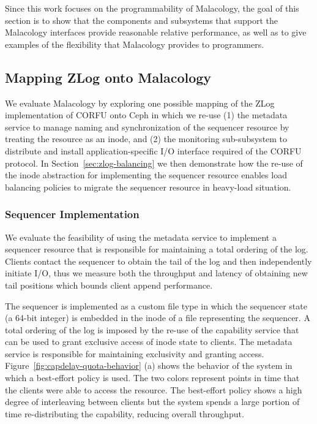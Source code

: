 \documentclass[preprint]{sigplanconf-eurosys}
\begin{document}

Since this work focuses on the programmability of Malacology, the goal of this
section is to show that the components and subsystems that support the
Malacology interfaces provide reasonable relative performance, as well as to
give examples of the flexibility that Malacology provides to programmers.


\subsection{Mapping ZLog onto Malacology}
\label{sec:mapping-zlog-onto-malacology}

We evaluate Malacology by exploring one possible mapping of the ZLog
implementation of CORFU onto Ceph in which we re-use (1) the metadata service
to manage naming and synchronization of the sequencer resource by treating the
resource as an inode, and (2) the monitoring sub-subsystem to distribute and
install application-specific I/O interface required of the CORFU protocol. In
Section~\ref{sec:zlog-balancing} we then demonstrate how the re-use of the inode
abstraction for implementing the sequencer resource enables load balancing policies
to migrate the sequencer resource in heavy-load situation.

\subsubsection{Sequencer Implementation}
\label{sec:sequencer-implementation}

We evaluate the feasibility of using the metadata service to implement a
sequencer resource that is responsible for maintaining a total ordering of
the log. Clients contact the sequencer to obtain the tail of the log and then
independently initiate I/O, thus we measure both the throughput and latency of
obtaining new tail positions which bounds client append performance.

The sequencer is implemented as a custom file type in which the sequencer
state (a 64-bit integer) is embedded in the inode of a file representing the
sequencer. A total ordering of the log is imposed by the re-use of the
capability service that can be used to grant exclusive access of inode state
to clients. The metadata service is responsible for maintaining exclusivity
and granting access. Figure~\ref{fig:capdelay-quota-behavior} (a) shows the
behavior of the system in which a best-effort policy is used.  The two colors
represent points in time that the clients were able to access the resource.
The best-effort policy shows a high degree of interleaving
between clients but the system spends a large portion of time re-distributing
the capability, reducing overall throughput.
\end{document}
